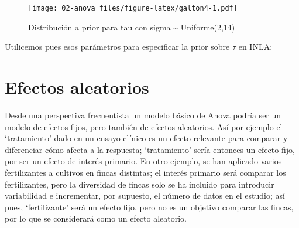 \documentclass[
]{book}
\newenvironment{Shaded}{\begin{snugshade}}{\end{snugshade}}
\newcommand{\AttributeTok}[1]{\textcolor[rgb]{0.77,0.63,0.00}{#1}}
\newcommand{\CommentTok}[1]{\textcolor[rgb]{0.56,0.35,0.01}{\textit{#1}}}
\newcommand{\DecValTok}[1]{\textcolor[rgb]{0.00,0.00,0.81}{#1}}
\newcommand{\FunctionTok}[1]{\textcolor[rgb]{0.00,0.00,0.00}{#1}}
\newcommand{\NormalTok}[1]{#1}
\newcommand{\OtherTok}[1]{\textcolor[rgb]{0.56,0.35,0.01}{#1}}
\newcommand{\SpecialCharTok}[1]{\textcolor[rgb]{0.00,0.00,0.00}{#1}}
\newcommand{\StringTok}[1]{\textcolor[rgb]{0.31,0.60,0.02}{#1}}
\begin{document}
\begin{figure}
\centering
\texttt{[image: 02-anova\_files/figure-latex/galton4-1.pdf]}
\caption{\label{fig:galton4}Distribución a prior para tau con sigma \textasciitilde{} Uniforme(2,14)}
\end{figure}

Utilicemos pues esos parámetros para especificar la prior sobre \(\tau\) en INLA:

\begin{Shaded}
\end{Shaded}

\hypertarget{efectos-aleatorios}{%
\section{Efectos aleatorios}\label{efectos-aleatorios}}

Desde una perspectiva frecuentista un modelo básico de Anova podría ser un modelo de efectos fijos, pero también de efectos aleatorios. Así por ejemplo el `tratamiento' dado en un ensayo clínico es un efecto relevante para comparar y diferenciar cómo afecta a la respuesta; `tratamiento' sería entonces un efecto fijo, por ser un efecto de interés primario. En otro ejemplo, se han aplicado varios fertilizantes a cultivos en fincas distintas; el interés primario será comparar los fertilizantes, pero la diversidad de fincas solo se ha incluido para introducir variabilidad e incrementar, por supuesto, el número de datos en el estudio; así pues, `fertilizante' será un efecto fijo, pero no es un objetivo comparar las fincas, por lo que se considerará como un efecto aleatorio.
\end{document}

